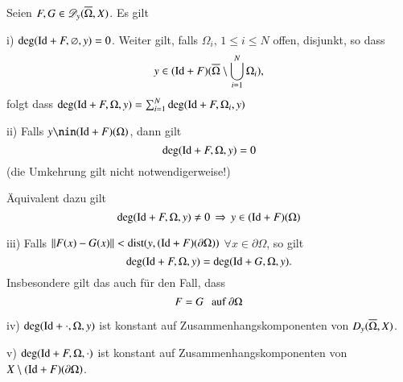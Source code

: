 \begin{theorem}\label{3.11}
    Seien $F,G\in \mathscr D_y(\overline\Omega,X)$. Es gilt
    \begin{description}
        \item{i)}
        $\deg(\mathrm{Id}+F,\varnothing,y)=0$. Weiter gilt, falls $\Omega_i$, $1\leq i\leq N$ offen, disjunkt,
        so dass
        \[
            y\in (\mathrm{Id}+F)(\overline\Omega\setminus\bigcup_{i=1}^N\Omega_i),
        \]
        folgt dass $\deg(\mathrm{Id}+F,\Omega,y)=\sum_{i=1}^N \deg(\mathrm{Id}+F,\Omega_i,y)$
        \item{ii)}
        Falls $y\nin (\Id+F)(\Omega)$, dann gilt
        \[
            \deg(\mathrm{Id}+F,\Omega,y)=0
        \]
        (die Umkehrung gilt nicht notwendigerweise!)

        Äquivalent dazu gilt
        \[
            \deg(\mathrm{Id}+F,\Omega,y)\neq 0 \, \Rightarrow \, y\in (\mathrm{Id}+F)(\Omega)
        \]
        \item{iii)}
        Falls $\|F(x)-G(x)\|<\mathrm{dist}(y,(\mathrm{Id}+F)(\partial\Omega))$ $\forall x\in \partial \Omega$, so gilt
        \[
            \deg(\mathrm{Id}+F,\Omega,y)=\deg(\mathrm{Id}+G,\Omega,y).
        \]
        Insbesondere gilt das auch für den Fall, dass
        \[
            F=G\hspace{.25cm} \text{auf } \partial \Omega
        \]
        \item{iv)}
        $\deg(\mathrm{Id}+\cdot,\Omega,y)$ ist konstant auf Zusammenhangskomponenten von $D_y(\overline\Omega,X)$.
        \item{v)}
        $\deg(\mathrm{Id}+F,\Omega,\cdot)$ ist konstant auf Zusammenhangskomponenten von $X\setminus 
        (\mathrm{Id}+F)(\partial \Omega)$.
    \end{description}
\end{theorem}
